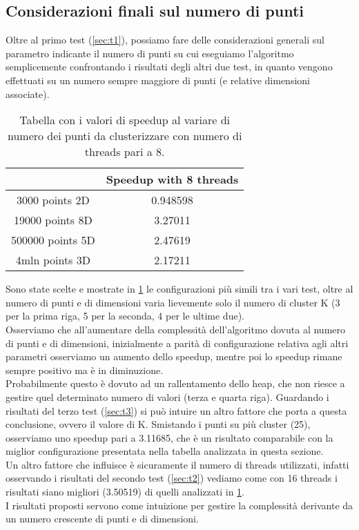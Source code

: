 \documentclass[10pt,twocolumn,letterpaper]{article}
\begin{document}
\subsection{Considerazioni finali sul numero di punti}
Oltre al primo test (\cref{sec:t1}), possiamo fare delle considerazioni generali sul parametro indicante il numero di punti su cui eseguiamo l'algoritmo semplicemente confrontando i risultati degli altri due test, in quanto vengono effettuati su un numero sempre maggiore di punti (e relative dimensioni associate).
\begin{table}[h]
\centering
\begin{tabular}{ |c|c| } 
\hline
 & Speedup with 8 threads \\
\hline
3000 points 2D & 0.948598\\
\hline
19000 points 8D & 3.27011\\
\hline
500000 points 5D & 2.47619\\
\hline
4mln points 3D & 2.17211\\
\hline
\end{tabular}
\vspace*{3mm}
\caption{Tabella con i valori di speedup al variare di numero dei punti da clusterizzare con numero di threads pari a 8.}
\label{table:t4}
\end{table}
Sono state scelte e mostrate in \cref{table:t4} le configurazioni più simili tra i vari test, oltre al numero di punti e di dimensioni varia lievemente solo il numero di cluster K (3 per la prima riga, 5 per la seconda, 4 per le ultime due).\\
Osserviamo che all'aumentare della complessità dell'algoritmo dovuta al numero di punti e di dimensioni, inizialmente a parità di configurazione relativa agli altri parametri osserviamo un aumento dello speedup, mentre poi lo speedup rimane sempre positivo ma è in diminuzione.\\
Probabilmente questo è dovuto ad un rallentamento dello heap, che non riesce a gestire quel determinato numero di valori (terza e quarta riga). Guardando i risultati del terzo test (\cref{sec:t3}) si può intuire un altro fattore che porta a questa conclusione, ovvero il valore di K. Smistando i punti su più cluster (25), osserviamo uno speedup pari a 3.11685, che è un risultato comparabile con la miglior configurazione presentata nella tabella analizzata in questa sezione. \\
Un altro fattore che influisce è sicuramente il numero di threads utilizzati, infatti osservando i risultati del secondo test (\cref{sec:t2}) vediamo come con 16 threads i risultati siano migliori (3.50519) di quelli analizzati in \cref{table:t4}.\\
I risultati proposti servono come intuizione per gestire la complessità derivante da un numero crescente di punti e di dimensioni.
\end{document}
